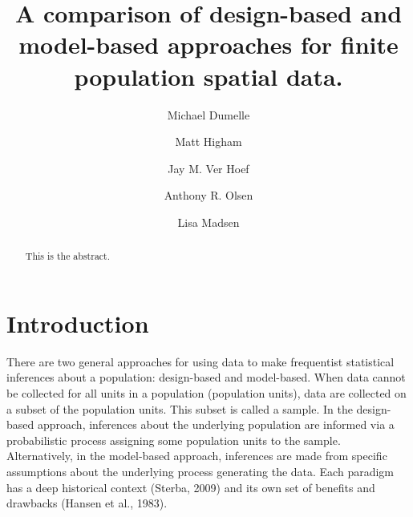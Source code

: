 \documentclass[]{elsarticle} %
\begin{document}
\begin{frontmatter}

  \title{A comparison of design-based and model-based approaches for
finite population spatial data.}
    \author[USEPA]{Michael Dumelle}
  
    \author[STLAW]{Matt Higham}
  
    \author[NOAA]{Jay M. Ver Hoef}
  
    \author[USEPA]{Anthony R. Olsen}
  
    \author[OSU]{Lisa Madsen}
  
      \address[USEPA]{United States Environmental Protection Agency, 200
SW 35th St, Corvallis, Oregon, 97333}
    \address[STLAW]{Saint Lawrence University Department of Mathematics,
Computer Science, and Statistics, 23 Romoda Drive, Canton, New York,
13617}
    \address[NOAA]{Marine Mammal Laboratory, Alaska Fisheries Science
Center, National Oceanic and Atmospheric Administration, Seattle,
Washington, 98115}
    \address[OSU]{Oregon State University Department of Statistics, 239
Weniger Hall, Corvallis, Oregon, 97331}
  
  \begin{abstract}
  This is the abstract.
  \end{abstract}
  
 \end{frontmatter}

\hypertarget{sec:introduction}{%
\section{Introduction}\label{sec:introduction}}

There are two general approaches for using data to make frequentist
statistical inferences about a population: design-based and model-based.
When data cannot be collected for all units in a population (population
units), data are collected on a subset of the population units. This
subset is called a sample. In the design-based approach, inferences
about the underlying population are informed via a probabilistic process
assigning some population units to the sample. Alternatively, in the
model-based approach, inferences are made from specific assumptions
about the underlying process generating the data. Each paradigm has a
deep historical context (Sterba, 2009) and its own set of benefits and
drawbacks (Hansen et al., 1983).
\end{document}
